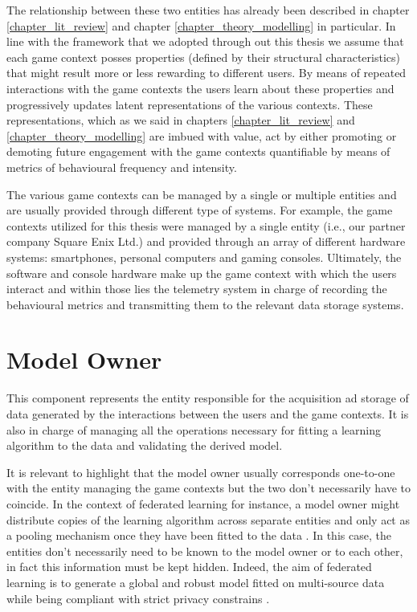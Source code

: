 The relationship between these two entities has already been described in chapter \ref{chapter_lit_review} and chapter \ref{chapter_theory_modelling} in particular. In line with the framework that we adopted through out this thesis we assume that each game context posses properties (defined by their structural characteristics) that might result more or less rewarding to different users. By means of repeated interactions with the game contexts the users learn about these properties and progressively updates latent representations of the various contexts. These representations, which as we said in chapters \ref{chapter_lit_review} and \ref{chapter_theory_modelling} are imbued with value, act by either promoting or demoting future engagement with the game contexts quantifiable by means of metrics of behavioural frequency and intensity.

The various game contexts can be managed by a single or multiple entities and are usually provided through different type of systems. For example, the game contexts utilized for this thesis were managed by a single entity (i.e., our partner company Square Enix Ltd.) and provided through an array of different hardware systems: smartphones, personal computers and gaming consoles. Ultimately, the software and console hardware make up the game context with which the users interact and within those lies the telemetry system in charge of recording the behavioural metrics and transmitting them to the relevant data storage systems.

\section{Model Owner}
\label{model_owner}
This component represents the entity responsible for the acquisition ad storage of data generated by the interactions between the users and the game contexts. It is also in charge of managing all the operations necessary for fitting a learning algorithm to the data and validating the derived model. 

It is relevant to highlight that the model owner usually corresponds one-to-one with the entity managing the game contexts but the two don't necessarily  have to coincide. In the context of federated learning  \cite{yang2019federated} for instance, a model owner might distribute copies of the learning algorithm across separate entities and only act as a pooling mechanism  once they have been fitted to the data \cite{kairouz2021advances}. In this case, the entities don't necessarily need to be known to the model owner or to each other, in fact this information must be kept hidden. Indeed, the aim of federated learning is to generate a global and robust model fitted on multi-source data while being compliant with strict privacy constrains \cite{yang2019federated, kairouz2021advances}. 


